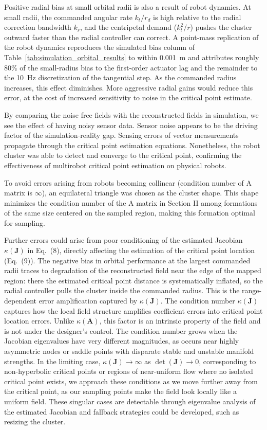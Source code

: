 \documentclass[lettersize,journal]{IEEEtran}
\begin{document}
Positive radial bias at small orbital radii is also a result of robot dynamics. At small radii, the commanded angular rate $k_t / r_d$ is high relative to the radial correction bandwidth $k_r$, and the centripetal demand ($k_t^2 / r$) pushes the cluster outward faster than the radial controller can correct. A point-mass replication of the robot dynamics reproduces the simulated bias column of Table~\ref{tab:simulation_orbital_results} to within 0.001~m and attributes roughly 80\% of the small-radius bias to the first-order actuator lag and the remainder to the 10~Hz discretization of the tangential step. As the commanded radius increases, this effect diminishes. More aggressive radial gains would reduce this error, at the cost of increased sensitivity to noise in the critical point estimate.

By comparing the noise free fields with the reconstructed fields in simulation, we see the effect of having noisy sensor data. Sensor noise appears to be the driving factor of the simulation-reality gap. Sensing errors of vector measurements propagate through the critical point estimation equations. Nonetheless, the robot cluster was able to detect and converge to the critical point, confirming the effectiveness of multirobot critical point estimation on physical robots.

To avoid errors arising from robots becoming collinear (condition number of A matrix is $\infty$), an equilateral triangle was chosen as the cluster shape. This shape minimizes the condition number of the A matrix in Section II among formations of the same size centered on the sampled region, making this formation optimal for sampling.

Further errors could arise from poor conditioning of the estimated Jacobian $\kappa(\mathbf{J})$ in Eq.~(8), directly affecting the estimation of the critical point location (Eq.~(9)). The negative bias in orbital performance at the largest commanded radii traces to degradation of the reconstructed field near the edge of the mapped region: there the estimated critical point distance is systematically inflated, so the radial controller pulls the cluster inside the commanded radius. This is the range-dependent error amplification captured by $\kappa(\mathbf{J})$. The condition number $\kappa(\mathbf{J})$ captures how the local field structure amplifies coefficient errors into critical point location errors. Unlike $\kappa(\mathbf{A})$, this factor is an intrinsic property of the field and is not under the designer's control. The condition number grows when the Jacobian eigenvalues have very different magnitudes, as occurs near highly asymmetric nodes or saddle points with disparate stable and unstable manifold strengths. In the limiting case, $\kappa(\mathbf{J}) \to \infty$ as $\det(\mathbf{J}) \to 0$, corresponding to non-hyperbolic critical points or regions of near-uniform flow where no isolated critical point exists, we approach these conditions as we move further away from the critical point, as our sampling points make the field look locally like a uniform field. These singular cases are detectable through eigenvalue analysis of the estimated Jacobian and fallback strategies could be developed, such as resizing the cluster.
\end{document}
